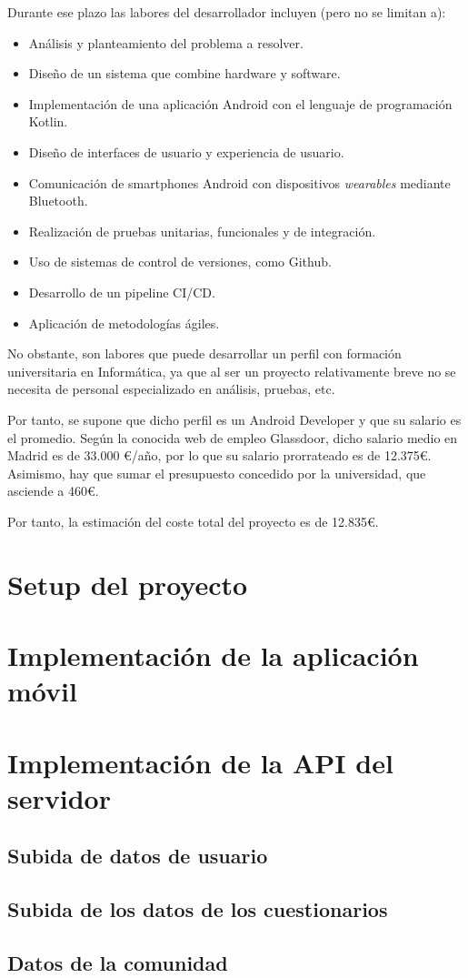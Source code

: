                 Durante ese plazo las labores del desarrollador incluyen (pero no se limitan a):
                \begin{itemize}
                    \item Análisis y planteamiento del problema a resolver.
                    \item Diseño de un sistema que combine hardware y software.
                    \item Implementación de una aplicación Android con el lenguaje de programación Kotlin.
                    \item Diseño de interfaces de usuario y experiencia de usuario. 
                    \item Comunicación de smartphones Android con dispositivos \textit{wearables} mediante Bluetooth.
                    \item Realización de pruebas unitarias, funcionales y de integración.
                    \item Uso de sistemas de control de versiones, como Github.
                    \item Desarrollo de un pipeline CI/CD.
                    \item Aplicación de metodologías ágiles.
                \end{itemize}
                
                No obstante, son labores que puede desarrollar un perfil con formación universitaria en Informática, ya que al ser un proyecto relativamente breve no se necesita de personal especializado en análisis, pruebas, etc. 
                
                Por tanto, se supone que dicho perfil es un Android Developer y que su salario es el promedio. Según la conocida web de empleo Glassdoor, dicho salario medio en Madrid es de 33.000 €/año, por lo que su salario prorrateado es de 12.375€. Asimismo, hay que sumar el presupuesto concedido por la universidad, que asciende a 460€.
                
                Por tanto, la estimación del coste total del proyecto es de 12.835€.

     
    \section{Setup del proyecto}

    \section{Implementación de la aplicación móvil}

    \section{Implementación de la API del servidor}

        \subsection{Subida de datos de usuario}

        \subsection{Subida de los datos de los cuestionarios}

        \subsection{Datos de la comunidad}
